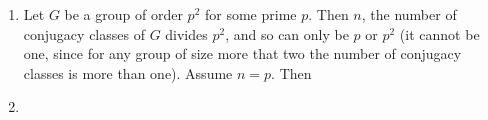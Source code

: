 \documentclass[11pt]{article} \usepackage{amssymb}
\begin{document}
\begin{enumerate}
\item
  Let $G$ be a group of order $p^2$ for some prime $p$. Then $n$, the number of
  conjugacy classes of $G$ divides $p^2$, and so can only be $p$ or
  $p^2$ (it cannot be one, since for any group of size more that two the number
  of conjugacy classes is more than one). Assume $n=p$. Then 

\item
  
\end{enumerate}
\end{document}
